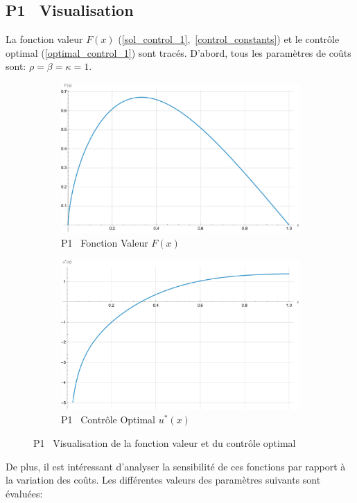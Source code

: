 \subsection{P1 \textemdash~Visualisation}
La fonction valeur $F(x)$ (\ref{sol_control_1},~\ref{control_constants}) et le contrôle optimal (\ref{optimal_control_1}) sont tracés. D'abord, tous les paramètres de coûts sont: $\rho=\beta=\kappa=1$.
\begin{figure}[htb]
    \centering
    \begin{subfigure}{0.45\linewidth}
        \includegraphics[width=\linewidth]{img/validation/P1/p1_value.pdf}
        \caption{P1 \textemdash~Fonction Valeur $F(x)$}\label{fig:ValueVisualisation1}
    \end{subfigure}
    \hfill
    \begin{subfigure}{0.45\linewidth}
        \includegraphics[width=\linewidth]{img/validation/P1/p1_control.pdf}
        \caption{P1 \textemdash~Contrôle Optimal $u^*(x)$}\label{fig:ControlVisualisation1}
    \end{subfigure}
    \caption{P1 \textemdash~Visualisation de la fonction valeur et du contrôle optimal}\label{fig:ValueControlComparison1}
\end{figure}\FloatBarrier De plus, il est intéressant d'analyser la sensibilité de ces fonctions par rapport à la variation des coûts. Les différentes valeurs des paramètres suivants sont évaluées:
